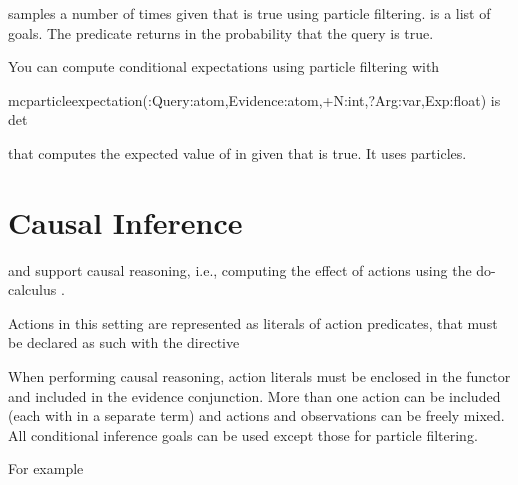 \documentclass[letterpaper,10pt,english]{sphinxmanual}
\begin{document}
samples  a number of  times given that  is true using particle filtering.  is a list of goals.
The predicate returns in  the probability that the query is true.

You can compute conditional expectations using particle filtering with

\begin{sphinxVerbatim}[commandchars=\\\{\}]
mc\PYGZus{}particle\PYGZus{}expectation(:Query:atom,Evidence:atom,+N:int,?Arg:var,\PYGZhy{}Exp:float) is det
\end{sphinxVerbatim}

that computes the expected value of  in  given that  is true.
It uses  particles.


\section{Causal Inference}
\label{\detokenize{index:causal-inference}}
 and  support causal reasoning, i.e., computing the effect of actions using the do-calculus .

Actions in this setting are represented as literals of action predicates, that must be declared as such with the directive

\begin{sphinxVerbatim}[commandchars=\\\{\}]
  
\end{sphinxVerbatim}

When performing causal reasoning, action literals must be enclosed in the  functor and included in the evidence conjunction.
More than one action can be included (each with in a separate  term) and actions and observations can be freely mixed.
All conditional inference goals can be used except those for particle filtering.

For example
\end{document}
